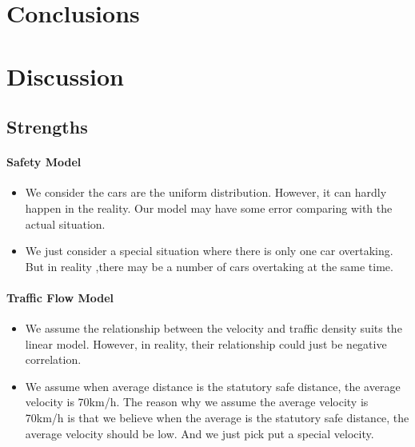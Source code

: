 \section{Conclusions}




\section{Discussion}

\subsection{Strengths}

\paragraph{Safety Model}

\begin{itemize}
\item We consider the cars are the uniform distribution. However, it can hardly happen in the reality. Our model may have some error comparing with the actual situation.
\item We just consider a special situation where there is only one car overtaking. But in reality ,there may be a number of cars overtaking at the same time.
\end{itemize}

\paragraph{Traffic Flow Model}

\begin{itemize}
\item We assume the relationship between the velocity and traffic density suits the linear model. However, in reality, their relationship could just be negative correlation.
\item We assume when average distance is the statutory safe distance, the average  velocity is 70km/h. The reason why we assume the average velocity is 70km/h is that we believe when the average is the statutory safe distance, the average velocity should be low. And we just pick put a special velocity.
\end{itemize}

